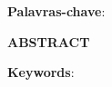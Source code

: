 \setlength{\absparsep}{10pt}%
\makeatletter
\begin{resumo}

	\SingleSpacing
	\imprimirresumotcc\space
	 \textbf{Palavras-chave}:\imprimirpalavraschave

	\begin{center}
	    \textbf{ABSTRACT}
	\end{center}
	\imprimirabstracttcc \space
	\textbf{Keywords}: \imprimirkeywords
\end{resumo}
\makeatother